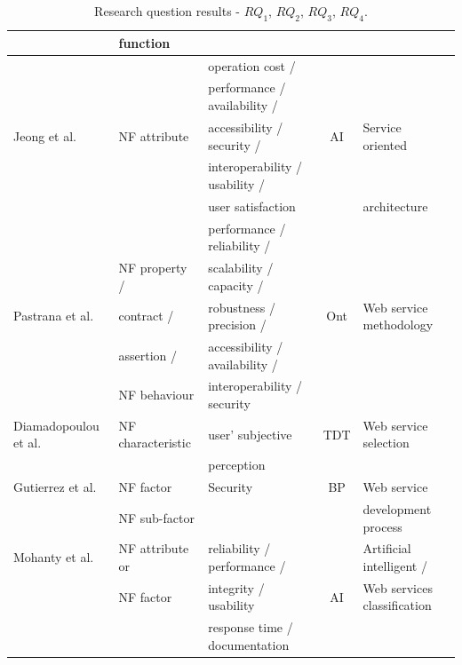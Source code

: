 \begin{table}[ht!]
\begin{tabular}{l|l|l|c|l}
  &  function &    &  &
  \\
  \hline
   &  & operation cost /&  &  \\
  &  & performance / availability /  &  &  \\
  Jeong et al. \cite{JeongCL09} & NF attribute & accessibility / security /
  & AI  & Service oriented   \\ 
   &  &
  interoperability / usability / & & \\ &  & user satisfaction &  & architecture
  \\
  \hline
   &  & performance / reliability /  &  & \\
   & NF property / & scalability / capacity /&  & \\
  Pastrana et al. \cite{PastranaPK11} & contract  / & robustness /
  precision / & Ont & Web service methodology\\
  & assertion / & accessibility
  / availability / &  & \\ 
   & NF behaviour & interoperability / security  &  & \\    
  \hline
  Diamadopoulou et al. \cite{DiamadopoulouMPS08} & NF characteristic &
  user' subjective & TDT & Web service selection  \\ 
   &  & perception  & &  \\
  \hline
  Gutierrez et al. \cite{GutierrezRF10} & NF factor & Security  & BP &  Web
  service
  \\
   &  NF sub-factor&   &  &  development process
  \\  
  \hline
  Mohanty et al. \cite{MohantyRP10} & NF attribute or & reliability /
  performance / & & Artificial intelligent /\\ 
  & NF factor & integrity / usability  & AI  & Web services classification	 \\
  &  & response time / documentation &   &  \\
  
  \hline  
  \hline  
\end{tabular} 
\caption{Research question results - $RQ_1$, $RQ_2$, $RQ_3$, $RQ_4$.}
\label{tab:result02}
\end{table} 
 
